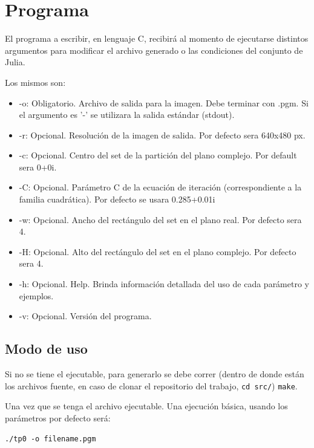 \documentclass[10pt,a4paper]{article}
\begin{document}
\section{Programa}
El programa a escribir, en lenguaje C, recibirá al momento de ejecutarse distintos argumentos para modificar el archivo generado o las condiciones del conjunto de Julia.

Los mismos son:

\begin{itemize}
    \item -o: Obligatorio. Archivo de salida para la imagen. Debe terminar con .pgm. Si el argumento es '-' se utilizara la salida estándar (stdout).
    
    \item -r: Opcional. Resolución de la imagen de salida. Por defecto sera 640x480 px.
    
    \item -c: Opcional. Centro del set de la partición del plano complejo. Por default sera 0+0i.
    
    \item -C: Opcional. Parámetro C de la ecuación de iteración (correspondiente a la familia cuadrática). Por defecto se usara 0.285+0.01i
    
    \item -w: Opcional. Ancho del rectángulo del set en el plano real. Por defecto sera 4.
    
    \item -H: Opcional. Alto del rectángulo del set en el plano complejo. Por defecto sera 4.
    
    \item -h: Opcional. Help. Brinda información detallada del uso de cada parámetro y ejemplos.
    
    \item -v: Opcional. Versión del programa.
\end{itemize}

\subsection{Modo de uso}
Si no se tiene el ejecutable, para generarlo se debe correr (dentro de donde están los archivos fuente, en caso de clonar el repositorio del trabajo, \texttt{cd src/}) \texttt{make}.

Una vez que se tenga el archivo ejecutable. Una ejecución básica, usando los parámetros por defecto será:

\texttt{./tp0 -o filename.pgm}
\end{document}

